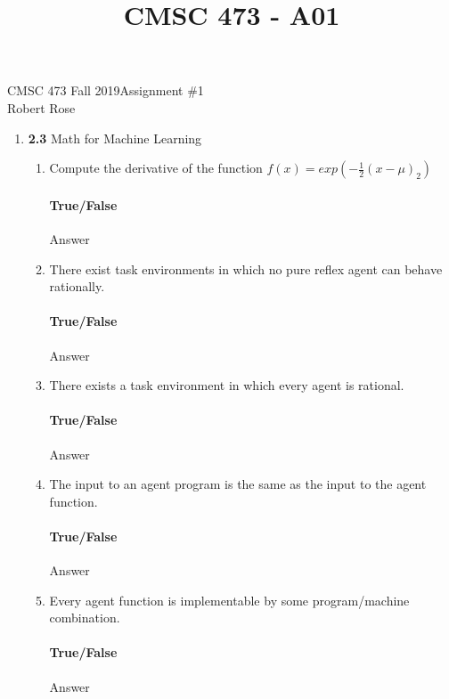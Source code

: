 \documentclass[12pt]{article}
\title{CMSC 473 - A01}
\begin{document}
CMSC 473 Fall 2019\hfill Assignment \#1\\
Robert Rose

\hrulefill

\begin{enumerate}
\item \textbf{2.3} Math for Machine Learning
  \begin{enumerate}
  \item Compute the derivative of the function $f(x) = exp(-\frac{1}{2}(x - \mu)_2)$\\
  \vspace{-2.5em}
  \paragraph{True/False} Answer

  \item There exist task environments in which no pure reflex agent can behave rationally.\\
  \vspace{-2.5em}
  \paragraph{True/False} Answer

  \item There exists a task environment in which every agent is rational.\\
  \vspace{-2.5em}
  \paragraph{True/False} Answer

  \item The input to an agent program is the same as the input to the agent function.\\
  \vspace{-2.5em}
  \paragraph{True/False} Answer

  \item Every agent function is implementable by some program/machine combination.\\
  \vspace{-2.5em}
  \paragraph{True/False} Answer


\end{enumerate}
\end{enumerate}
\end{document}
